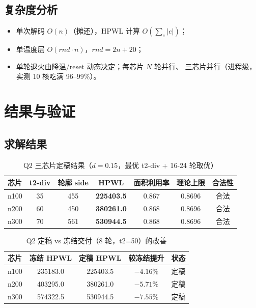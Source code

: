 \documentclass[12pt,a4paper]{article}
\begin{document}
\subsection{复杂度分析}

\begin{itemize}
    \item 单次解码 $O(n)$（摊还），HPWL 计算 $O(\sum_e |e|)$；
    \item 单温度层 $O(rnd \cdot n)$，$rnd = 2n + 20$；
    \item 单轮退火由降温/reset 动态决定；每芯片 $N$ 轮并行、
    三芯片并行（进程级，实测 10 核吃满 96--99\%）。
\end{itemize}

\section{结果与验证}

\subsection{求解结果}

\begin{table}[H]
\centering
\small
\caption{Q2 三芯片定稿结果（$d=0.15$，最优 t2-div + 16-24 轮取优）}
\begin{tabular}{lcccccc}
\toprule
芯片 & t2-div & 轮廓 side & HPWL & 面积利用率 & 理论上限 & 合法性 \\
\midrule
n100 & 35 & 455 & \textbf{225403.5} & 0.867 & 0.8696 & 合法 \\
n200 & 60 & 450 & \textbf{380261.0} & 0.868 & 0.8696 & 合法 \\
n300 & 70 & 561 & \textbf{530944.5} & 0.868 & 0.8696 & 合法 \\
\bottomrule
\end{tabular}
\end{table}

\begin{table}[H]
\centering
\small
\caption{Q2 定稿 vs 冻结交付（8 轮，t2=50）的改善}
\begin{tabular}{lcccc}
\toprule
芯片 & 冻结 HPWL & 定稿 HPWL & 较冻结提升 & 状态 \\
\midrule
n100 & 235183.0 & 225403.5 & $-4.16\%$ & 定稿 \\
n200 & 403295.0 & 380261.0 & $-5.71\%$ & 定稿 \\
n300 & 574322.5 & 530944.5 & $-7.55\%$ & 定稿 \\
\bottomrule
\end{tabular}
\end{table}
\end{document}
